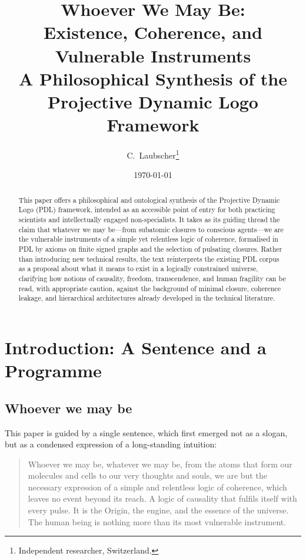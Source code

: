 \documentclass[11pt,a4paper]{article}
\theoremstyle{definition}
\begin{document}
\title{Whoever We May Be:\\[4pt]
Existence, Coherence, and Vulnerable Instruments\\[4pt]
A Philosophical Synthesis of the Projective Dynamic Logo Framework}

\author{C.~Laubscher\thanks{Independent researcher, Switzerland.}\\[4pt]}

\date{\small \today}

\maketitle

\begin{abstract}
This paper offers a philosophical and ontological synthesis of the Projective Dynamic Logo (PDL) framework, intended as an accessible point of entry for both practicing scientists and intellectually engaged non-specialists. It takes as its guiding thread the claim that whatever we may be---from subatomic closures to conscious agents---we are the vulnerable instruments of a simple yet relentless logic of coherence, formalised in PDL by axioms on finite signed graphs and the selection of pulsating closures. Rather than introducing new technical results, the text reinterprets the existing PDL corpus as a proposal about what it means to exist in a logically constrained universe, clarifying how notions of causality, freedom, transcendence, and human fragility can be read, with appropriate caution, against the background of minimal closure, coherence leakage, and hierarchical architectures already developed in the technical literature.
\end{abstract}

\tableofcontents

\section{Introduction: A Sentence and a Programme}
\label{sec:intro}

\subsection{Whoever we may be}

This paper is guided by a single sentence, which first emerged not as a slogan, but as a condensed expression of a long-standing intuition:

\begin{quote}
Whoever we may be, whatever we may be, from the atoms that form our molecules and cells to our very thoughts and souls, we are but the necessary expression of a simple and relentless logic of coherence, which leaves no event beyond its reach. A logic of causality that fulfils itself with every pulse. It is the Origin, the engine, and the essence of the universe. The human being is nothing more than its most vulnerable instrument.
\end{quote}
\end{document}
